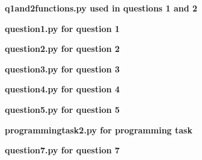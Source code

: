 \documentclass[12pt, a4paper]{article}
\begin{document}
\pagebreak
\textbf{q1and2\textunderscore functions.py used in questions 1 and 2}\centering\label{finddec}

\vspace{2cm}

\pagebreak
\textbf{question\textunderscore 1.py for question 1}\centering

\vspace{6cm}

\pagebreak
\textbf{question\textunderscore 2.py for question 2}\centering

\vspace{2cm}

\pagebreak
\textbf{question\textunderscore 3.py for question 3}\centering

\vspace{6cm}

\textbf{question\textunderscore 4.py for question 4}\centering

\vspace{2cm}

\pagebreak
\textbf{question\textunderscore 5.py for question 5}\centering

\vspace{2cm}

\pagebreak
\textbf{programming\textunderscore task\textunderscore 2.py for programming task}\centering\label{programmingtask2}

\vspace{2cm}

\pagebreak
\textbf{question\textunderscore 7.py for question 7}\centering

\vspace{2cm}
\end{document}
